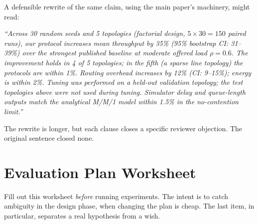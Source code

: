 \documentclass[11pt]{article}
\begin{document}
A defensible rewrite of the same claim, using the main paper's machinery,
might read:

\begin{shaded*}
\noindent\emph{``Across 30 random seeds and 5 topologies (factorial design,
$5\times 30 = 150$ paired runs), our protocol increases mean throughput by
35\% (95\% bootstrap CI: 31--39\%) over the strongest published baseline at
moderate offered load $\rho = 0.6$. The improvement holds in 4 of 5
topologies; in the fifth (a sparse line topology) the protocols are within
1\%. Routing overhead increases by 12\% (CI: 9--15\%); energy is within 2\%.
Tuning was performed on a held-out validation topology; the test
topologies above were not used during tuning. Simulator delay and
queue-length outputs match the analytical M/M/1 model within 1.5\% in the
no-contention limit.''}
\end{shaded*}

The rewrite is longer, but each clause closes a specific reviewer
objection. The original sentence closed none.

\section{Evaluation Plan Worksheet}
\label{sec:worksheet}

Fill out this worksheet \emph{before} running experiments. The intent is
to catch ambiguity in the design phase, when changing the plan is cheap.
The last item, in particular, separates a real hypothesis from a wish.

\newcommand{\wsline}{\vspace{6pt}\hrule height 0.4pt\vspace{6pt}\hrule height 0.4pt\vspace{8pt}}
\end{document}
